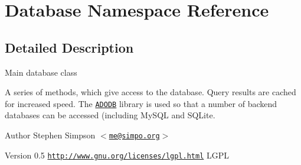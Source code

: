 \hypertarget{namespaceDatabase}{
\section{Database Namespace Reference}
\label{namespaceDatabase}
}


\subsection{Detailed Description}
Main database class

A series of methods, which give access to the database. Query results are cached for increased speed. The \href{http://adodb.sourceforge.net/}{\tt ADODB} library is used so that a number of backend databases can be accessed (including MySQL and SQLite.

\begin{DoxyAuthor}{Author}
Stephen Simpson $<$\href{mailto:me@simpo.org}{\tt me@simpo.org}$>$ 
\end{DoxyAuthor}
\begin{DoxyVersion}{Version}
0.5  \href{http://www.gnu.org/licenses/lgpl.html}{\tt http://www.gnu.org/licenses/lgpl.html} LGPL 
\end{DoxyVersion}
